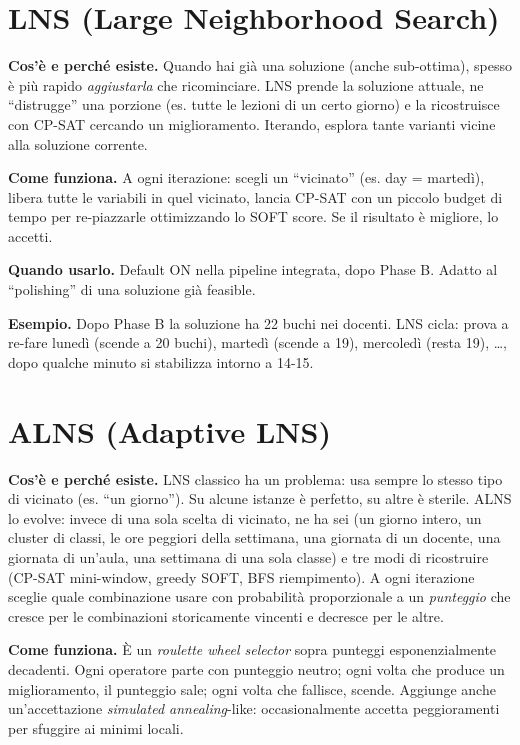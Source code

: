 \section{LNS (Large Neighborhood Search)}

\textbf{Cos'\`e e perch\'e esiste.} Quando hai gi\`a una
soluzione (anche sub-ottima), spesso \`e pi\`u rapido
\emph{aggiustarla} che ricominciare. LNS prende la soluzione
attuale, ne ``distrugge'' una porzione (es. tutte le lezioni
di un certo giorno) e la ricostruisce con CP-SAT cercando un
miglioramento. Iterando, esplora tante varianti vicine alla
soluzione corrente.

\textbf{Come funziona.} A ogni iterazione: scegli un
``vicinato'' (es. day = marted\`i), libera tutte le variabili
in quel vicinato, lancia CP-SAT con un piccolo budget di
tempo per re-piazzarle ottimizzando lo SOFT score. Se il
risultato \`e migliore, lo accetti.

\textbf{Quando usarlo.} Default ON nella pipeline integrata,
dopo Phase B. Adatto al ``polishing'' di una soluzione
gi\`a feasible.

\textbf{Esempio.} Dopo Phase B la soluzione ha 22 buchi nei
docenti. LNS cicla: prova a re-fare luned\`i (scende a 20
buchi), marted\`i (scende a 19), mercoled\`i (resta 19),
\dots, dopo qualche minuto si stabilizza intorno a 14-15.

\section{ALNS (Adaptive LNS)}

\textbf{Cos'\`e e perch\'e esiste.} LNS classico ha un
problema: usa sempre lo stesso tipo di vicinato (es. ``un
giorno''). Su alcune istanze \`e perfetto, su altre \`e
sterile. ALNS lo evolve: invece di una sola scelta di
vicinato, ne ha sei (un giorno intero, un cluster di classi,
le ore peggiori della settimana, una giornata di un docente,
una giornata di un'aula, una settimana di una sola classe) e
tre modi di ricostruire (CP-SAT mini-window, greedy SOFT,
BFS riempimento). A ogni iterazione sceglie quale combinazione
usare con probabilit\`a proporzionale a un \emph{punteggio}
che cresce per le combinazioni storicamente vincenti e
decresce per le altre.

\textbf{Come funziona.} \`E un \emph{roulette wheel selector}
sopra punteggi esponenzialmente decadenti. Ogni operatore
parte con punteggio neutro; ogni volta che produce un
miglioramento, il punteggio sale; ogni volta che fallisce,
scende. Aggiunge anche un'accettazione \emph{simulated
annealing}-like: occasionalmente accetta peggioramenti per
sfuggire ai minimi locali.

